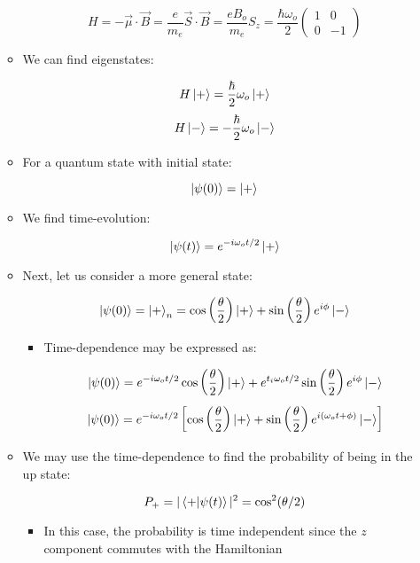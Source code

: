 \begin{itemize}
\begin{itemize}
        $$H=-\vec{\mu}\cdot\vec{B}=\frac{e}{m_e}\vec{S}\cdot\vec{B}=\frac{eB_o}{m_e}S_z=\frac{\hbar\omega_o}{2}\left( \begin{matrix} 1 & 0\\ 0 &-1\end{matrix} \right)$$

      \item We can find eigenstates:

        $$H\ket{+}=\frac{\hbar}{2}\omega_o\ket{+}$$
        $$H\ket{-}=-\frac{\hbar}{2}\omega_o\ket{-}$$

      \item For a quantum state with initial state:

        $$\ket{\psi(0)}=\ket{+}$$

      \item We find time-evolution:

        $$\ket{\psi(t)}=e^{-i\omega_o t/2}\ket{+}$$

      \item Next, let us consider a more general state:

        $$\ket{\psi(0)}=\ket{+}_n=\cos\left( \frac{\theta}{2} \right)\ket{+}+\sin\left( \frac{\theta}{2} \right)e^{i\phi}\ket{-}$$

        \begin{itemize}

          \item Time-dependence may be expressed as:

            $$\ket{\psi(0)}=e^{-i\omega_ot/2}\cos\left( \frac{\theta}{2} \right)\ket{+}+e^{t_i\omega_ot/2}\sin\left( \frac{\theta}{2} \right)e^{i\phi}\ket{-}$$
            $$\ket{\psi(0)}=e^{-i\omega_ot/2}\left[\cos\left( \frac{\theta}{2} \right)\ket{+}+\sin\left( \frac{\theta}{2} \right)e^{i(\omega_ot+\phi)}\ket{-}\right]$$

        \end{itemize}

      \item We may use the time-dependence to find the probability of being in the up state:

        $$P_+=|\bra{+}\ket{\psi(t)}|^2=\cos^2(\theta/2)$$

        \begin{itemize}

          \item In this case, the probability is time independent since the $z$ component commutes with the Hamiltonian


\end{itemize}
\end{itemize}
\end{itemize}
